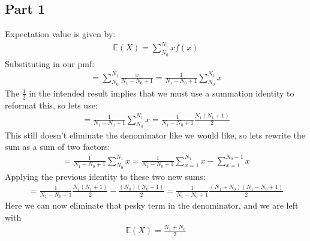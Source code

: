 \documentclass{article}
\begin{document}
\subsection*{Part 1}
Expectation value is given by:
\begin{align*}
\mathbb{E}(X) = \sum_{N_0}^{N_1} x f(x)
\end{align*}
Substituting in our pmf:
\begin{align*}
 = \sum_{N_0}^{N_1} \frac{x}{N_1-N_0+1} = \frac{1}{N_1-N_0+1} \sum_{N_0}^{N_1} x
\end{align*}
The $\frac{1}{2}$ in the intended result implies that we must use a summation identity to reformat this, so lets use:
\begin{align*}
 = \frac{1}{N_1-N_0+1} \sum_{N_0}^{N_1} x = \frac{1}{N_1-N_0+1} \frac{N_1(N_1+1)}{2}
\end{align*}
This still doesn't eliminate the denominator like we would like, so lets rewrite the sum as a sum of two factors:
\begin{align*}
 = \frac{1}{N_1-N_0+1} \sum_{N_0}^{N_1} x = \frac{1}{N_1-N_0+1} \sum_{x=1}^{N_1} x - \sum_{x=1}^{N_0-1} x
\end{align*}
Applying the previous identity to these two new sums:
\begin{align*}
 =  \frac{1}{N_1-N_0+1} \frac{N_1(N_1+1)}{2} - \frac{(N_0)(N_0-1)}{2} = \frac{1}{N_1-N_0+1} \frac{(N_1+N_0)(N_1-N_0+1)}{2}
\end{align*}
Here we can now eliminate that pesky term in the denominator, and we are left with
\begin{align*}
\boxed {\mathbb{E}(X) = \frac{N_1+N_0}{2}}
\end{align*}
\clearpage
\end{document}
